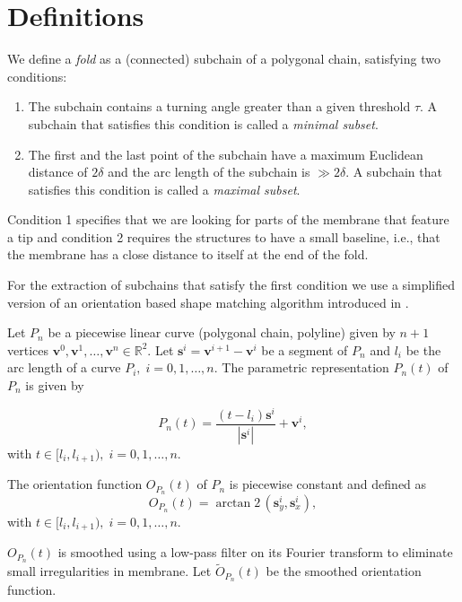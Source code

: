 \documentclass[twocolumn,a4paper]{article}
\begin{document}
\section{Definitions}
\label{subsec:infoex}
We define a \emph{fold} as a (connected) subchain of a polygonal chain, satisfying two conditions:
\begin{enumerate}
    \item The subchain contains a turning angle greater than a given threshold $\tau$. A subchain that satisfies this condition is
    called a \emph{minimal subset}.
    \item The first and the last point of the subchain have a maximum Euclidean distance of $2\delta$ and the arc length of the subchain is \mbox{$\gg\!2\delta$}.
A subchain that satisfies this condition is called a \emph{maximal subset}. 
\end{enumerate}
Condition 1 specifies that we are looking for parts of the membrane that feature a tip and condition 2 requires the structures to have a small baseline, i.e., that the membrane has a close distance to itself at the end of the fold.

For the extraction of subchains that satisfy the first condition we use a simplified version of an orientation based shape matching algorithm introduced in \cite{CohenGuibas97}. 


Let $P_n$ be a piecewise linear curve (poly\-gonal chain, polyline) given by $n+1$ vertices $\mathbf{v}^0, \mathbf{v}^1, \dots, \mathbf{v}^{n} \in \mathbb{R}^2$.
Let $\mathbf{s}^i = \mathbf{v}^{i+1} - \mathbf{v}^i$ be a segment of $P_n$ and $l_i$ be the arc length of a curve $P_i, \; i=0,1,\dots,n$.
The parametric representation $P_n(t)$ of $P_n$ is given by

\begin{equation}
    P_n(t) = \frac{ ( t-l_i )  \mathbf{s}^i }
    {|\mathbf{s}^i|} + \mathbf{v}^i,
\end{equation}
with $t \in [l_i, l_{i+1} ), \; i = 0,1,\dots,n$.

The orientation function $O_{P_n}(t)$ of $P_n$ is piecewise constant and defined as
\begin{equation}
    O_{P_n}(t) = \arctan\!2\,( \mathbf{s}^i_y, \mathbf{s}^i_x ),
\end{equation}
with $t \in [l_i, l_{i+1} ), \; i = 0,1, \dots, n$.


$O_{P_n}(t)$ is smoothed using a low-pass filter on its Fourier transform to eliminate small irregularities in membrane.
Let $\tilde{O}_{P_n}(t)$ be the smoothed orientation function.
\end{document}
